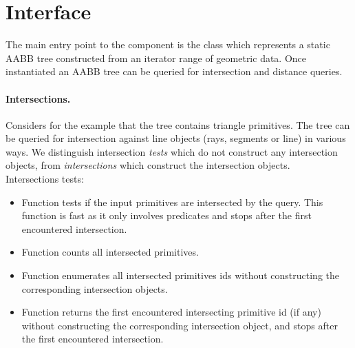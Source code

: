 \section{Interface}
\label{AABB_tree_section_interface}

The main entry point to the component is the class  which represents a static AABB tree constructed from an iterator range of geometric data. Once instantiated an AABB tree can be queried for intersection and distance queries.\\


\paragraph{Intersections.} Considers for the example that the tree contains triangle primitives. The tree can be queried for intersection against line objects (rays, segments or line) in various ways. We distinguish intersection \emph{tests} which do not construct any intersection objects, from \emph{intersections} which construct the intersection objects.\\


Intersections tests:
\begin{itemize}
\item Function  tests if the input primitives are intersected by the query. This function is fast as it only involves predicates and stops after the first encountered intersection.
\item Function  counts all intersected primitives.
\item Function  enumerates all intersected primitives ids without constructing the corresponding intersection objects.
\item Function  returns the first encountered intersecting primitive id (if any) without constructing the corresponding intersection object, and stops after the first encountered intersection.
\end{itemize}


